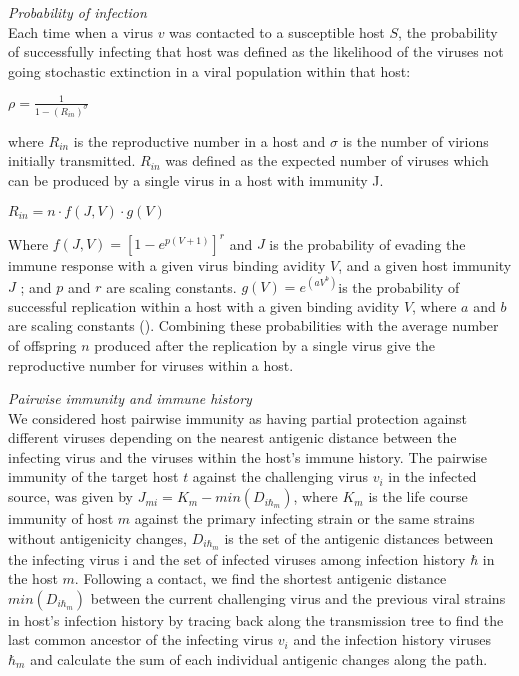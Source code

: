 \documentclass[12pt,a4paper]{article}
\begin{document}
\textit{Probability of infection} \\
Each time when a virus $v$ was contacted to a susceptible host $S$, the probability of successfully infecting that host was defined as the likelihood of the viruses not going stochastic extinction in a viral population within that host:

$\rho = \frac{1}{1-(R_{in})^\sigma}$

where $R_{in}$ is the reproductive number in a host and $\sigma$ is the number of virions initially transmitted. $R_{in}$ was defined as the expected number of viruses which can be produced by a single virus in a host with immunity J.

$R_{in}=n \cdot f(J,V) \cdot g(V)$

Where $f(J,V) = [1 - e^{p(V+1)}]^r$ and $J$ is the probability of evading the immune response with a given virus binding avidity $V$, and a given host immunity $J$ ;  and $p$ and $r$ are scaling constants. $g(V) = e^{(aV^b)}$is the probability of successful replication within a host with a given binding avidity $V$, where $a$ and $b$ are scaling constants (\cite{Yuan2013}). Combining these probabilities with the average number of offspring $n$ produced after the replication by a single virus give the reproductive number for viruses within a host.

\textit{Pairwise immunity and immune history} \\
We considered host pairwise immunity as having partial protection against different viruses depending on the nearest antigenic distance between the infecting virus and the viruses within the host’s immune history. The pairwise immunity of the target host $t$ against the challenging virus $v_{i}$ in the infected source, was given by $J_{mi}=K_{m}-min(D_{i\hbar_{m}})$, where $K_{m}$ is the life course immunity of host $m$ against the primary infecting strain or the same strains without antigenicity changes, $D_{i\hbar_{m}}$ is the set of the antigenic distances between the infecting virus i and the set of infected viruses among infection history $\hbar$ in the host $m$. Following a contact, we find the shortest antigenic distance $min(D_{i\hbar_{m}})$ between the current challenging virus and the previous viral strains in host’s infection history by tracing back along the transmission tree to find the last common ancestor of the infecting virus $v_{i}$ and the infection history viruses $\hbar_{m}$ and calculate the sum of each individual antigenic changes along the path.
\end{document}
